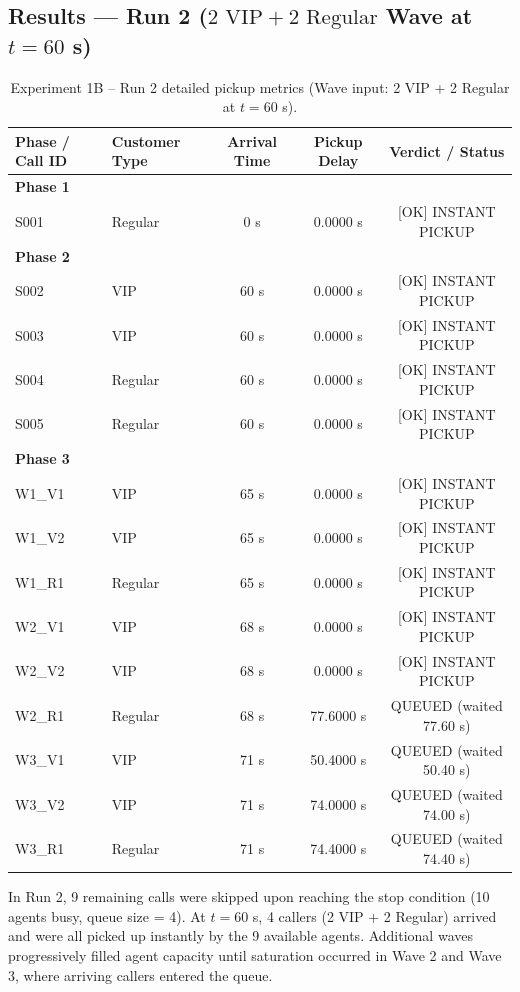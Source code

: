 \documentclass[11pt]{article}
\begin{document}
\subsection{Results --- Run 2 ($2\text{ VIP} + 2\text{ Regular}$ Wave at $t=60$ s)}

\begin{table}[htbp]
\centering
\small
\begin{tabular}{llccc}
\toprule
\textbf{Phase / Call ID} & \textbf{Customer Type} & \textbf{Arrival Time} & \textbf{Pickup Delay} & \textbf{Verdict / Status} \\
\midrule
\textbf{Phase 1} & & & & \\
S001 & Regular & 0 s & 0.0000 s & [OK] INSTANT PICKUP \\
\midrule
\textbf{Phase 2} & & & & \\
S002 & VIP & 60 s & 0.0000 s & [OK] INSTANT PICKUP \\
S003 & VIP & 60 s & 0.0000 s & [OK] INSTANT PICKUP \\
S004 & Regular & 60 s & 0.0000 s & [OK] INSTANT PICKUP \\
S005 & Regular & 60 s & 0.0000 s & [OK] INSTANT PICKUP \\
\midrule
\textbf{Phase 3} & & & & \\
W1\_V1 & VIP & 65 s & 0.0000 s & [OK] INSTANT PICKUP \\
W1\_V2 & VIP & 65 s & 0.0000 s & [OK] INSTANT PICKUP \\
W1\_R1 & Regular & 65 s & 0.0000 s & [OK] INSTANT PICKUP \\
W2\_V1 & VIP & 68 s & 0.0000 s & [OK] INSTANT PICKUP \\
W2\_V2 & VIP & 68 s & 0.0000 s & [OK] INSTANT PICKUP \\
W2\_R1 & Regular & 68 s & 77.6000 s & QUEUED (waited 77.60 s) \\
W3\_V1 & VIP & 71 s & 50.4000 s & QUEUED (waited 50.40 s) \\
W3\_V2 & VIP & 71 s & 74.0000 s & QUEUED (waited 74.00 s) \\
W3\_R1 & Regular & 71 s & 74.4000 s & QUEUED (waited 74.40 s) \\
\bottomrule
\end{tabular}
\caption{Experiment 1B -- Run 2 detailed pickup metrics (Wave input: 2 VIP + 2 Regular at $t=60$ s).}
\end{table}

In Run 2, 9 remaining calls were skipped upon reaching the stop condition (10 agents busy, queue size = 4). At $t=60$ s, 4 callers (2 VIP + 2 Regular) arrived and were all picked up instantly by the 9 available agents. Additional waves progressively filled agent capacity until saturation occurred in Wave 2 and Wave 3, where arriving callers entered the queue.
\end{document}
